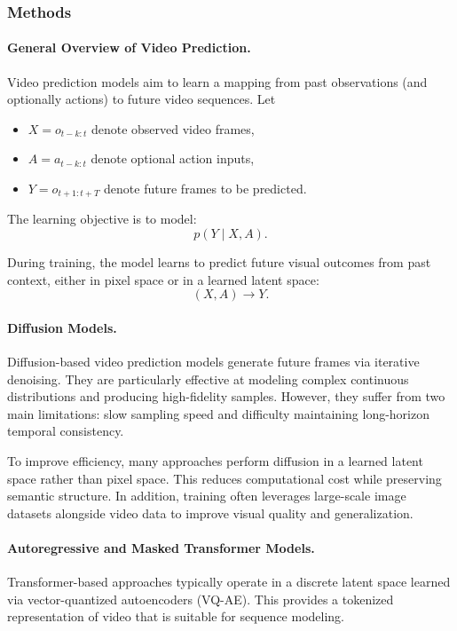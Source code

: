 \subsubsection{Methods}

\paragraph{General Overview of Video Prediction.}
Video prediction models aim to learn a mapping from past observations (and optionally actions) to future video sequences. Let
\begin{itemize}
    \item $X = o_{t-k:t}$ denote observed video frames,
    \item $A = a_{t-k:t}$ denote optional action inputs,
    \item $Y = o_{t+1:t+T}$ denote future frames to be predicted.
\end{itemize}

The learning objective is to model:
\[
p(Y \mid X, A).
\]

During training, the model learns to predict future visual outcomes from past context, either in pixel space or in a learned latent space:
\[
(X, A) \rightarrow Y.
\]

\paragraph{Diffusion Models.}
Diffusion-based video prediction models generate future frames via iterative denoising. They are particularly effective at modeling complex continuous distributions and producing high-fidelity samples. However, they suffer from two main limitations: slow sampling speed and difficulty maintaining long-horizon temporal consistency.

To improve efficiency, many approaches perform diffusion in a learned latent space rather than pixel space. This reduces computational cost while preserving semantic structure. In addition, training often leverages large-scale image datasets alongside video data to improve visual quality and generalization.

\paragraph{Autoregressive and Masked Transformer Models.}
Transformer-based approaches typically operate in a discrete latent space learned via vector-quantized autoencoders (VQ-AE). This provides a tokenized representation of video that is suitable for sequence modeling.

